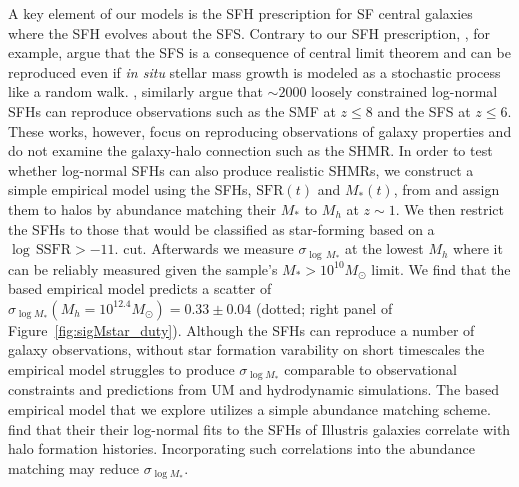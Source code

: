 \documentclass[12pt, letterpaper, preprint, tighten]{aastex62}
\newcommand{\edt}[1]{{\color{dred}{\bf} #1}}
\newcommand{\siglogm}{\sigma_{\log M_*}}
\begin{document}
A key element of our models is the SFH prescription for SF central galaxies where
the SFH evolves about the SFS. Contrary to our SFH prescription, \cite{kelson2014},
for example, argue that the SFS is a consequence of central limit theorem
and can be reproduced even if \emph{in situ} stellar mass growth is modeled as
a stochastic process like a random walk. \cite{gladders2013,abramson2015,abramson2016},
similarly argue that $\sim2000$ loosely constrained log-normal SFHs can reproduce
observations such as the SMF at $z \leq 8$ and the SFS at $z \leq 6$. These works,
however, focus on reproducing observations of galaxy properties and do not examine
the galaxy-halo connection such as the SHMR. In order to test whether log-normal
SFHs can also produce realistic SHMRs,
\edt{we construct a simple empirical model using  the SFHs, $\mathrm{SFR}(t)$ and
$M_*(t)$, from \cite{abramson2016} and assign them to halos by abundance matching
their $M_*$ to $M_h$ at $z{\sim}1$.}
We then restrict the SFHs to those that would be classified as star-forming based
on a $\log\,\mathrm{SSFR} > -11.$ cut. Afterwards we measure $\sigma_{\log\,M_*}$
at the lowest $M_h$ where it can be reliably measured given the \cite{abramson2016}
sample's $M_*{>}10^{10}M_\odot$ limit.
\edt{We find that the \cite{abramson2016} based empirical model predicts a scatter
of $\siglogm(M_h=10^{12.4}M_\odot) = 0.33\pm0.04$ (dotted; right panel of Figure~\ref{fig:sigMstar_duty}).
Although the \cite{abramson2016} SFHs can reproduce a number of galaxy observations,
without star formation varability on short timescales the empirical model struggles
to produce $\siglogm$ comparable to observational constraints and predictions
from UM and hydrodynamic simulations.}
\edt{The \cite{abramson2016} based empirical model that we explore utilizes a simple
abundance matching scheme. \cite{diemer2017} find that their their log-normal fits
to the SFHs of Illustris galaxies correlate with halo formation histories. Incorporating
such correlations into the abundance matching may reduce $\siglogm$.}
\end{document}
